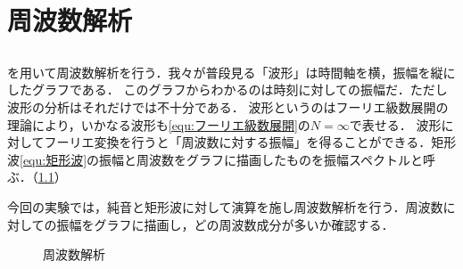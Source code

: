 \chapter{周波数解析}
\section{\kadaiba}\label{sec:\kadaiba}
\purpose
\matlab を用いて周波数解析を行う．我々が普段見る「波形」は時間軸を横，振幅を縦にしたグラフである．
このグラフからわかるのは時刻に対しての振幅だ．ただし波形の分析はそれだけでは不十分である．
波形というのはフーリエ級数展開の理論により，いかなる波形も\eqref{equ:フーリエ級数展開}の\(N=\infty\)で表せる．
波形に対してフーリエ変換を行うと「周波数に対する振幅」を得ることができる．矩形波\eqref{equ:矩形波}の振幅と周波数をグラフに描画したものを振幅スペクトルと呼ぶ．（\ref{fig:周波数解析}）\par
今回の実験では，純音と矩形波に対して演算を施し周波数解析を行う．周波数に対しての振幅をグラフに描画し，どの周波数成分が多いか確認する．
\begin{figure}[H]
    \centering
    
    \caption{周波数解析}
    \label{fig:周波数解析}
\end{figure}
\method
